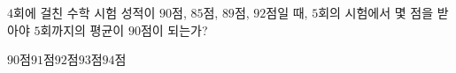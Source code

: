 $4$회에 걸친 수학 시험 성적이 $90$점, $85$점, $89$점, $92$점일 때, $5$회의 시험에서 몇 점을 받아야 $5$회까지의 평균이 $90$점이 되는가?
\begin{choices32}{$90$점}{$91$점}{$92$점}{$93$점}{$94$점}\end{choices32}
